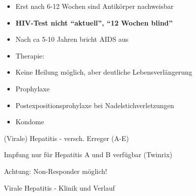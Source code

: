 \documentclass{article}
\newcommand\gEs[1]{\textbf{\textcolor[rgb]{0.0,0.0,0.5019608}{#1}}}
\newcommand\gEs[1]{\textbf{\textcolor[rgb]{0.0,0.0,0.5019608}{#1}}}
\begin{document}
\begin{itemize}
\item {\mdseries
Erst nach 6-12 Wochen sind Antik\"orper nachweisbar}

\end{itemize}
\begin{itemize}
\item {\mdseries
\gEs{HIV-Test nicht
{\textquotedblleft}aktuell{\textquotedblright}, {\textquotedblleft}12
Wochen blind{\textquotedblright}}}

\end{itemize}
\begin{itemize}
\item {\mdseries
Nach ca 5-10 Jahren bricht AIDS aus}

\item {\mdseries
Therapie:}

\end{itemize}
\begin{itemize}
\item {\mdseries
Keine Heilung m\"oglich, aber deutliche Lebensverl\"angerung}

\end{itemize}
\begin{itemize}
\item {\mdseries
Prophylaxe}

\end{itemize}
\begin{itemize}
\item {\mdseries
Postexpositionsprohylaxe bei Nadelstichverletzungen}

\item {\mdseries
Kondome}

\end{itemize}
{\mdseries\color[rgb]{0.0,0.0,0.5019608}
(Virale) Hepatitis - versch. Erreger (A-E)}

{\mdseries
Impfung nur f\"ur Hepatitis A und B verf\"ugbar
(Twinrix{\texttrademark})}

{\mdseries
Achtung: Non-Responder m\"oglich!}

{\mdseries\color{black}
Virale Hepatitis - Klinik und Verlauf}
\end{document}
